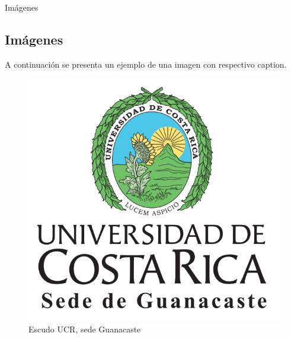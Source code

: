\begin{frame}{Imágenes}
\subsection{Imágenes}
\label{sec:imagenes}

A continuación se presenta un ejemplo de una imagen con respectivo caption. 

\vspace{1cm}

\begin{figure}[h!]
\centering
\includegraphics[scale = 0.1]{Imagenes/thumbnail_logo1.png}
\caption{Escudo UCR, sede Guanacaste}
\end{figure}

\end{frame}